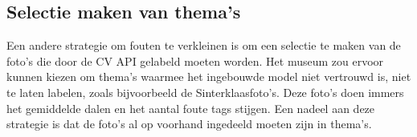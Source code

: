 \subsection{Selectie maken van thema’s}

Een andere strategie om fouten te verkleinen is om een selectie te maken van de foto’s die door de CV API gelabeld moeten worden. Het museum zou ervoor kunnen kiezen om thema’s waarmee het ingebouwde model niet vertrouwd is, niet te laten labelen, zoals bijvoorbeeld de Sinterklaasfoto’s. Deze foto’s doen immers het gemiddelde dalen en het aantal foute tags stijgen. Een nadeel aan deze strategie is dat de foto’s al op voorhand ingedeeld moeten zijn in thema’s.